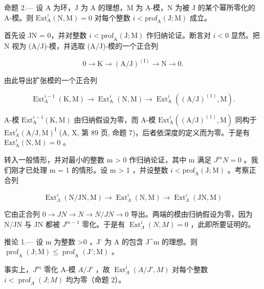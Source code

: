 命题 2.--- 设 A 为环，J 为 A 的理想，M 为 A-模，N 为被 J 的某个幂所零化的 A-模。则 \(\mathrm{Ext}_{\mathrm{A}}^{i}(\mathrm{N},\mathrm{M}) = 0\) 对每个整数 \(i < \mathrm{prof}_{\mathrm{A}}(\mathrm{J};\mathrm{M})\) 成立。

首先设 JN = 0，并对整数 \(i < \mathrm{prof}_{\mathrm{A}}(\mathrm{J};\mathrm{M})\) 作归纳论证。断言对 \(i < 0\) 显然。把 N 视为 (A/J)-模，并选取 (A/J)-模的一个正合列

\[
0 \rightarrow \mathrm{K} \longrightarrow (\mathrm{A} / \mathrm{J}) ^ {(\mathrm{I})} \longrightarrow \mathrm{N} \rightarrow 0.
\]

由此导出扩张模的一个正合列

\[
\operatorname{Ext} _ {\mathrm{A}} ^ {i - 1} (\mathrm{K}, \mathrm{M}) \longrightarrow \operatorname{Ext} _ {\mathrm{A}} ^ {i} (\mathrm{N}, \mathrm{M}) \longrightarrow \operatorname{Ext} _ {\mathrm{A}} ^ {i} ((\mathrm{A} / \mathrm{J}) ^ {(1)}, \mathrm{M}).
\]

A-模 \(\mathrm{Ext}_{\mathrm{A}}^{i-1}(\mathrm{K},\mathrm{M})\) 由归纳假设为零，而 A-模 \(\mathrm{Ext}_{\mathrm{A}}^{i}((\mathrm{A}/\mathrm{J})^{(1)},\mathrm{M})\) 同构于 \(\mathrm{Ext}_{\mathrm{A}}^{i}(\mathrm{A}/\mathrm{J},\mathrm{M})^{\mathrm{I}}\) (A, X, 第 89 页, 命题 7)，后者依深度的定义而为零。于是有 \(\mathrm{Ext}_{\mathrm{A}}^{i}(\mathrm{N},\mathrm{M}) = 0\) 。

转入一般情形，并对最小的整数 m \textgreater{} 0 作归纳论证，其中 m 满足 \(J^{m}N = 0\) 。我们刚才已处理 m = 1 的情形。设 m \textgreater{} 1 ，并设整数 \(i < \text{prof}_{\text{A}}(\text{J}; \text{M})\) 。考察正合列

\[
\operatorname{Ext} _ {\Lambda} ^ {i} (\mathrm{N/JN,M}) \longrightarrow \operatorname{Ext} _ {\Lambda} ^ {i} (\mathrm{N,M}) \longrightarrow \operatorname{Ext} _ {\Lambda} ^ {i} (\mathrm{JN,M})
\]

它由正合列 \(0 \rightarrow JN \rightarrow N \rightarrow N/JN \rightarrow 0\) 导出。两端的模由归纳假设为零，因为 N/JN 与 JN 都被 \(J^{m-1}\) 零化。于是有 \(\operatorname{Ext}_{\Lambda}^{i}(N,M) = 0\) ，此即所要证明的。

推论 1.--- 设 m 为整数 \textgreater0 ，J' 为 A 的包含 J\^{}m 的理想。则 \(\operatorname{prof}_{\mathrm{A}}(\mathrm{J};\mathrm{M}) \leqslant \operatorname{prof}_{\mathrm{A}}(\mathrm{J}';\mathrm{M})\) 。

事实上，\(J^{m}\) 零化 A-模 \(A/J'\) ，故 \(\operatorname{Ext}_{A}^{i}(A/J', M)\) 对每个整数 \(i < \operatorname{prof}_{A}(J; M)\) 均为零（命题 2）。


